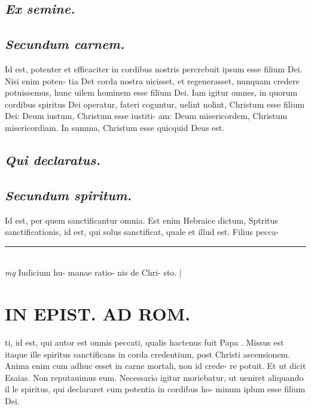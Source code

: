 \documentclass{article}
\begin{document}
\begin{pages}
\subsection*{\textit{Ex semine. }}
{}
\subsection*{\textit{Secundum carnem. }}\pstart Id est, potenter et efficaciter in cordibus nostris percrebuit ipsum esse filium Dei. Nisi enim poten- tia Det corda nostra uicisset, et regenerasset, nunquam credere potuissemus, hunc uilem hominem esse filium Dei. Iam igitur omnes, in quorum cordibus spiritus Dei operatur, fateri coguntur, uelint nolint, Christum esse filium Dei: Deum iustum, Christum esse iustiti- am: Deum misericordem, Christum misericordiam.  In summa, Christum esse quicquid Deus est.   \pend
{}
{}
\subsection*{\textit{Qui declaratus. }}
{}
\subsection*{\textit{Secundum spiritum. }}\pstart Id est, per quem sanctificantur omnia. Est enim Hebraice dictum, Sptritus sanctificationis, id est, qui solus sanctificat, quale et illud est. Filius pecca-  \pend
\vspace{0.5cm}\noindent
\vspace{0.2cm}\rule{1cm}{0.2pt}\\ 
\hspace{0.2cm}\textit{mg}
\footnotesize Iudicium hu- manae ratio- nis de Chri- sto.  
\normalsize| 
\section*{IN EPIST. AD ROM.  }
\marginpar{[ p.6 ]}\pstart ti, id est, qui autor est omnis peccati, qualis hactenus fuit Papa . Missus est itaque ille spiritus sanctificans in corda credentium, post Christi ascensionem. Anima enim cum adhuc esset in carne mortali, non id crede- re potuit. Et ut dicit Esaias. Non reputauimus eum.  Necessario igitur moriebatur, ut ueniret aliquando il le spiritus, qui declararet cum potentia in cordibus ho- minum iplum esse filium Dei.   \pend
{}
{}

\end{pages}
\end{document}
